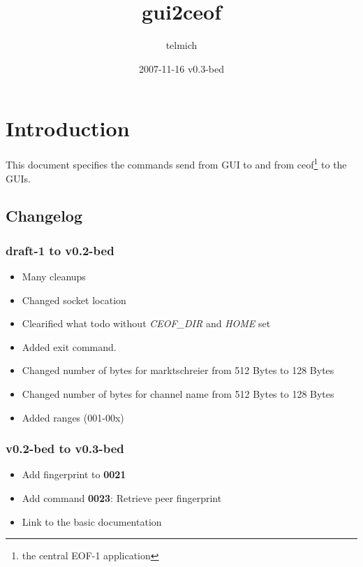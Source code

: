 \documentclass[12pt,a4paper]{article}
\begin{document}
\title{gui2ceof}
\date{2007-11-16 v0.3-bed}
\author{telmich}

\maketitle
\tableofcontents

\section{Introduction}
This document specifies the commands send from GUI to and from
ceof\footnote{the central EOF-1 application} to the GUIs.
\subsection{Changelog}
\subsubsection{draft-1 to v0.2-bed}
\begin{itemize}
\item Many cleanups
\item Changed socket location
\item Clearified what todo without \textit{CEOF\_DIR} and \textit{HOME} set
\item Added exit command.
\item Changed number of bytes for marktschreier from 512 Bytes to 128 Bytes
\item Changed number of bytes for channel name  from 512 Bytes to 128 Bytes
\item Added ranges (001-00x)
\end{itemize}
\subsubsection{v0.2-bed to v0.3-bed}
\begin{itemize}
\item Add fingerprint to \textbf{0021}
\item Add command \textbf{0023}: Retrieve peer fingerprint
\item Link to the basic documentation
\end{itemize}
\end{document}
